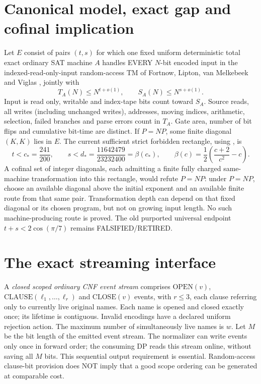 \documentclass[11pt]{article}
\begin{document}
\section{Canonical model, exact gap and cofinal implication}
Let $E$ consist of pairs $(t,s)$ for which one fixed uniform deterministic total
exact ordinary SAT machine $A$ handles EVERY $N$-bit encoded input in the
indexed-read-only-input random-access TM of Fortnow, Lipton, van Melkebeek
and Viglas \cite{FLMV}, jointly with
\[
T_A(N)\le N^{t+o(1)},\qquad S_A(N)\le N^{s+o(1)}.
\]
Input is read only, writable and index-tape bits count toward $S_A$.
Source reads, all writes (including unchanged writes), addresses, moving
indices, arithmetic, selection, failed branches and parse errors count in
$T_A$. Gate area, number of bit flips and cumulative bit-time are distinct.
If $P=NP$, some finite diagonal $(K,K)$ lies in $E$. The current
sufficient strict forbidden rectangle, using \cite[Theorem 3.1, Corollaries
3.2 and 5.8]{FLMV}, is
\[
 t<c_*=\frac{241}{200},\qquad
 s<d_*=\frac{11642479}{23232400}=\beta(c_*),\qquad
 \beta(c)=\frac12\left(\frac{c+2}{c^2}-c\right).
\]
A cofinal set of integer diagonals, each admitting a finite fully charged
same-machine transformation into this rectangle, would refute $P=NP$:
under $P=NP$, choose an available diagonal above the initial exponent and
an available finite route from that same pair. Transformation depth can
depend on that fixed diagonal or its chosen program, but not on growing
input length. No such machine-producing route is proved. The old purported
universal endpoint $t+s<2\cos(\pi/7)$ remains FALSIFIED/RETIRED.

\section{The exact streaming interface}
A \emph{closed scoped ordinary CNF event stream} comprises
$\mathrm{OPEN}(v)$, $\mathrm{CLAUSE}(\ell_1,\ldots,\ell_r)$ and
$\mathrm{CLOSE}(v)$ events, with $r\le3$, each clause referring only to
currently live original names. Each name is opened and closed exactly once;
its lifetime is contiguous. Invalid encodings have a declared uniform
rejection action. The maximum number of simultaneously live names is $w$.
Let $M$ be the bit length of the emitted event stream. The normalizer can
write events only once in forward order; the consuming DP reads this stream
online, without saving all $M$ bits. This sequential output requirement is
essential. Random-access clause-bit provision does NOT imply that a
good scope ordering can be generated at comparable cost.
\end{document}
